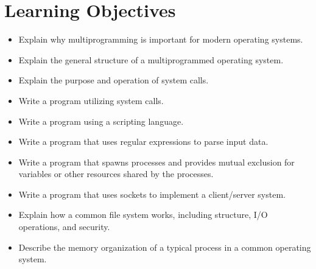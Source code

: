 \documentclass[10pt, letterpaper]{article}
\numberwithin{equation}{section}
\begin{document}
\section*{Learning Objectives}
\hrulefill \newline
\begin{itemize}
	\item Explain why multiprogramming is important for modern operating systems.
	\item Explain the general structure of a multiprogrammed operating system.
	\item Explain the purpose and operation of system calls.
	\item Write a program utilizing system calls.
	\item Write a program using a scripting language.
	\item Write a program that uses regular expressions to parse input data.
	\item Write a program that spawns processes and provides mutual exclusion for variables or other resources shared by the processes.
	\item Write a program that uses sockets to implement a client/server system.
	\item Explain how a common file system works, including structure, I/O operations, and security.
	\item Describe the memory organization of a typical process in a common operating system.
\end{itemize}
		
\end{document}
